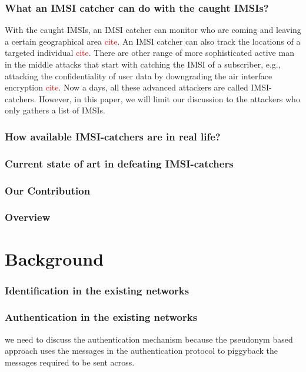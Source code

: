 \documentclass{llncs} %
\begin{document}
\subsubsection{What an IMSI catcher can do with the caught IMSIs?} With the caught IMSIs, an IMSI catcher can monitor who are coming and leaving a certain geographical area \textcolor{red}{cite}. An IMSI catcher can also track the locations of a targeted individual \textcolor{red}{cite}. There are other range of more sophisticated active man in the middle attacks that start with catching the IMSI of a subscriber, e.g., attacking the confidentiality of user data by downgrading the air interface encryption \textcolor{red}{cite}. Now a days, all these advanced attackers are called IMSI-catchers. However, in this paper, we will limit our discussion to the attackers who only gathers a list of IMSIs.

\subsubsection{How available IMSI-catchers are in real life?}

\subsubsection{Current state of art in defeating IMSI-catchers}

\subsubsection{Our Contribution}

\subsubsection{Overview}


\section{Background}

\subsubsection{Identification in the existing networks}
\subsubsection{Authentication in the existing networks} we need to discuss the authentication mechanism because the pseudonym based approach uses the messages in the authentication protocol to piggyback the messages required to be sent across.
\end{document}
